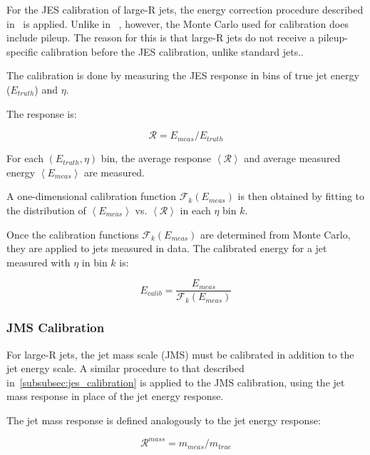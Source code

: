 For the JES calibration of large-R jets, the energy correction procedure described in~\cite{jet-energy-measurement}
is applied.
Unlike in ~\cite{jet-energy-measurement}, however, the Monte Carlo used for calibration does include pileup.
The reason for this is that large-R jets do not receive a pileup-specific calibration before the JES calibration,
unlike standard jets.\cite{jet-substructure-perf}.

The calibration is done by measuring the JES response in bins of true jet energy ($E_{truth}$) and $\eta$.

The response is:

\begin{equation}\label{eq:jet_jes_response}
    \mathcal{R} = E_{meas} / E_{truth}
\end{equation}

For each $\left(E_{truth}, \eta\right)$ bin, the average response $\left<\mathcal{R}\right>$
and average measured energy $\left<E_{meas}\right>$ are measured.

A one-dimensional calibration function $\mathcal{F}_k\left(E_{meas}\right)$ is then obtained by fitting to the
distribution of $\left<E_{meas}\right>$ vs. $\left<\mathcal{R}\right>$ in each $\eta$
bin $k$.\cite{jet-energy-measurement}

Once the calibration functions $\mathcal{F}_k(E_{meas})$ are determined from Monte Carlo, they are applied to
jets measured in data.
The calibrated energy for a jet measured with $\eta$ in bin $k$ is:

\begin{equation}\label{eq:jet_jes_calibration}
    E_{calib} = \frac{E_{meas}}{\mathcal{F}_k\left(E_{meas}\right)}
\end{equation}\cite{jet-energy-measurement}

\subsubsection{JMS Calibration}\label{subsubsec:jms_calibration}

For large-R jets, the jet mass scale (JMS) must be calibrated in addition to the jet energy scale.
A similar procedure to that described in~\ref{subsubsec:jes_calibration} is applied to the JMS calibration,
using the jet mass response in place of the jet energy response.

The jet mass response is defined analogously to the jet energy response:

\begin{equation}\label{eq:jet_mass_response}
    \mathcal{R}^{mass} = m_{meas} / m_{true}
\end{equation}

